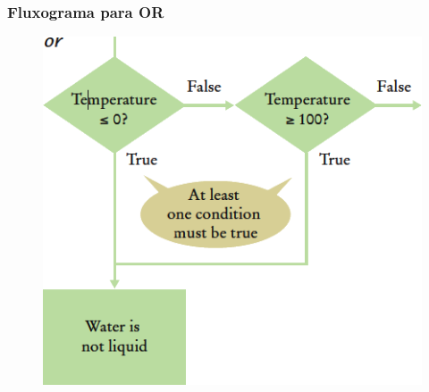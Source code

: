 \documentclass[xcolor={dvipsnames,table},aspectratio=169]{beamer}
\begin{document}
\begin{frame}[fragile]\frametitle{Fluxograma para OR}
\begin{figure}[h]
	\includegraphics[height=0.70\paperheight,center]{pucrs-ep-fprog-unidade_03-decisoes-laminas-fluxograma_or.png}
\end{figure}
\end{frame}
\end{document}
